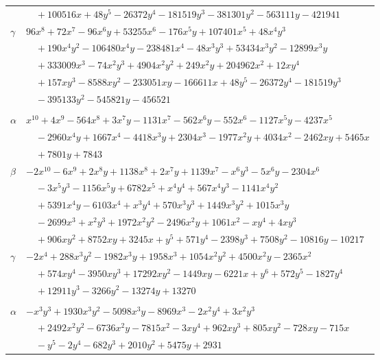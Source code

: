 \documentclass[11pt]{article}
\begin{document}
\begin{longtable}{@{}ll@{}}
 & $\quad +100516x+48y^{5}-26372y^{4}-181519y^{3}-381301y^{2}-563111y-421941$\\
$\gamma$ & $96x^{8}+72x^{7}-96x^{6}y+53255x^{6}-176x^{5}y+107401x^{5}+48x^{4}y^{3}$\\
 & $\quad +190x^{4}y^{2}-106480x^{4}y-238481x^{4}-48x^{3}y^{3}+53434x^{3}y^{2}-12899x^{3}y$\\
 & $\quad +333009x^{3}-74x^{2}y^{3}+4904x^{2}y^{2}+249x^{2}y+204962x^{2}+12xy^{4}$\\
 & $\quad +157xy^{3}-8588xy^{2}-233051xy-166611x+48y^{5}-26372y^{4}-181519y^{3}$\\
 & $\quad -395133y^{2}-545821y-456521$\\
\addlinespace[3pt]
\multicolumn{2}{@{}l}{$\{i,j\}=\{80,156\}$, $k_{ij}=2\cdot 3\cdot 7$}\\
$\alpha$ & $x^{10}+4x^{9}-564x^{8}+3x^{7}y-1131x^{7}-562x^{6}y-552x^{6}-1127x^{5}y-4237x^{5}$\\
 & $\quad -2960x^{4}y+1667x^{4}-4418x^{3}y+2304x^{3}-1977x^{2}y+4034x^{2}-2462xy+5465x$\\
 & $\quad +7801y+7843$\\
$\beta$ & $-2x^{10}-6x^{9}+2x^{8}y+1138x^{8}+2x^{7}y+1139x^{7}-x^{6}y^{3}-5x^{6}y-2304x^{6}$\\
 & $\quad -3x^{5}y^{3}-1156x^{5}y+6782x^{5}+x^{4}y^{4}+567x^{4}y^{3}-1141x^{4}y^{2}$\\
 & $\quad +5391x^{4}y-6103x^{4}+x^{3}y^{4}+570x^{3}y^{3}+1449x^{3}y^{2}+1015x^{3}y$\\
 & $\quad -2699x^{3}+x^{2}y^{3}+1972x^{2}y^{2}-2496x^{2}y+1061x^{2}-xy^{4}+4xy^{3}$\\
 & $\quad +906xy^{2}+8752xy+3245x+y^{5}+571y^{4}-2398y^{3}+7508y^{2}-10816y-10217$\\
$\gamma$ & $-2x^{4}+288x^{3}y^{2}-1982x^{3}y+1958x^{3}+1054x^{2}y^{2}+4500x^{2}y-2365x^{2}$\\
 & $\quad +574xy^{4}-3950xy^{3}+17292xy^{2}-1449xy-6221x+y^{6}+572y^{5}-1827y^{4}$\\
 & $\quad +12911y^{3}-3266y^{2}-13274y+13270$\\
\addlinespace[3pt]
\multicolumn{2}{@{}l}{$\{i,j\}=\{80,161\}$, $k_{ij}=3\cdot 7^{2}$}\\
$\alpha$ & $-x^{3}y^{3}+1930x^{3}y^{2}-5098x^{3}y-8969x^{3}-2x^{2}y^{4}+3x^{2}y^{3}$\\
 & $\quad +2492x^{2}y^{2}-6736x^{2}y-7815x^{2}-3xy^{4}+962xy^{3}+805xy^{2}-728xy-715x$\\
 & $\quad -y^{5}-2y^{4}-682y^{3}+2010y^{2}+5475y+2931$\\

\end{longtable}
\end{document}
